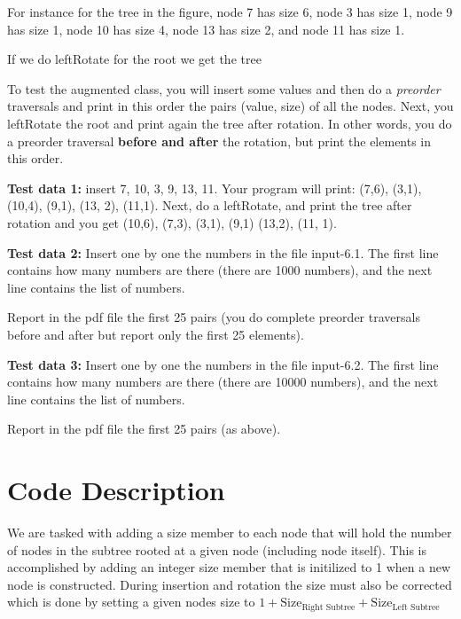 \documentclass[11pt]{article}
\begin{document}
For instance for the tree in the figure,  node 7 has size 6, node 3 has size 1, node 9 has size 1, node 10 has size 4, node 13 has size 2, and node 11 has size 1.

If we do \textsf{leftRotate} for the root we get the tree


To test the augmented class, you will insert some values and then do a \emph{preorder} traversals and print in this order  the pairs (value, size) of all the nodes. 	Next, you \textsf{leftRotate} the root and print again the tree after rotation. In other words, you do a preorder traversal \textbf{before and after} the rotation, but print the elements in this order.

\textbf{Test data 1:} insert 7, 10, 3, 9, 13, 11. Your program will print: (7,6), (3,1), (10,4), (9,1), (13, 2), (11,1).
Next, do a \textsf{leftRotate}, and print the tree after rotation and you get (10,6), (7,3), (3,1), (9,1) (13,2), (11, 1).




\textbf{Test data 2:}  Insert one by one the numbers in the file input-6.1. The first line contains how many numbers are there (there are 1000 numbers), and the next line contains the list of numbers.

Report in the pdf file the first 25 pairs (you do complete preorder traversals before and after but report only the first 25 elements).

\textbf{Test data 3:} Insert one by one the numbers in the file input-6.2. The first line contains how many numbers are there (there are 10000 numbers), and the next line contains the list of numbers.

Report in the pdf file the first 25 pairs (as above).

\pagebreak
\section*{Code Description}
    We are tasked with adding a size member to each node that will hold the number of nodes in the subtree rooted at a given node (including node itself). This is accomplished by adding an integer size member that is initilized to 1 when a new node is constructed. During insertion and rotation the size must also be corrected which is done by setting a given nodes size to  $1 + \text{Size}_\text{Right Subtree} + \text{Size}_\text{Left Subtree}$
\end{document}
